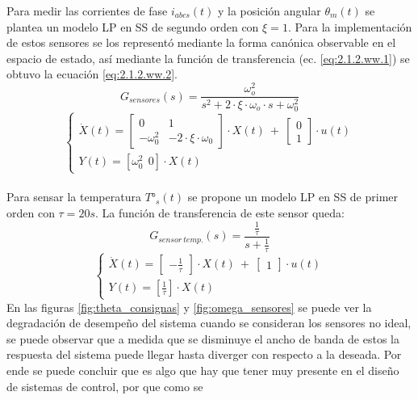 \documentclass[10pt]{article}
\begin{document}
\begin{itemize}
Para medir las corrientes de fase $i_{abcs}(t)$ y la posición angular $\theta_{m}(t)$ se plantea un modelo LP en SS de segundo orden con $\xi=1$. 
Para la implementación de estos sensores se los representó mediante la forma canónica observable en el espacio de estado, así mediante la función de transferencia (ec. \ref{eq:2.1.2.ww.1}) se obtuvo la ecuación \ref{eq:2.1.2.ww.2}.
		\begin{equation}
		G_{sensores}(s)=\frac{\omega_{o}^{2}}{s^{2}+ 2\cdot\xi\cdot\omega_{o}\cdot s + \omega_{0}^{2}}
			\label{eq:2.1.2.ww.1}
	\end{equation}
			\begin{equation}
\begin{cases}
\dot{X}(t)=\begin{bmatrix}
0 & 1\\ 
-\omega_{0}^{2} & -2\cdot\xi\cdot\omega_{0}
\end{bmatrix}
\cdot X(t)  \ + \
\begin{bmatrix}
0\\ 
1
\end{bmatrix} \cdot
u(t)
\\ 
Y(t)=[\omega_{0}^{2} \ \ 0]\cdot X(t)
\end{cases}
			\label{eq:2.1.2.ww.2}
	\end{equation}\\
Para sensar la temperatura $T°_{s}(t)$ se propone un modelo LP en SS de primer orden con $\tau=20s$. La función de transferencia de este sensor queda:
\begin{equation}
	G_{sensor\ temp.}(s)=\frac{ \frac{1}{\tau } }{ s + \frac{1}{\tau } }
\end{equation}
\begin{equation}
	\begin{cases}
	\dot{X}(t)=\begin{bmatrix}
	-\frac{1}{\tau }
	\end{bmatrix}
	\cdot X(t)  \ + \
	\begin{bmatrix}
	1
	\end{bmatrix} \cdot
	u(t)
	\\ 
	Y(t)=[\frac{1}{\tau}]\cdot X(t)
	\end{cases}
		\end{equation}
En las figuras \ref{fig:theta_consignas} y \ref{fig:omega_sensores} se puede ver la degradación de desempeño del sistema cuando se consideran los sensores no ideal, se puede observar que a medida que se disminuye el ancho de banda de estos
 la respuesta del sistema puede llegar hasta diverger con respecto a la deseada. Por ende se puede concluir que es algo que hay que tener muy presente en el diseño de sistemas de control, por que como se 

\end{itemize}
\end{document}
